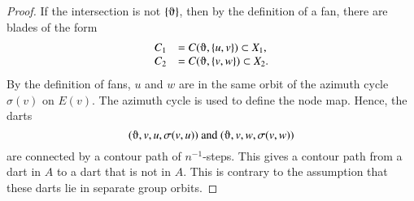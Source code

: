 \begin{proof} 
If the intersection  is not $\{\orgn\}$, then by
the definition
of a fan,
there are blades of the form
  $$
  \begin{array}{lll}
   C_1 &= C(\orgn,\{u,v\})\subset X_1,\\
   C_2 &= C(\orgn,\{v,w\})\subset X_2.\\
  \end{array}
  $$
By the definition of fans, $u$ and $w$ are
in the same orbit of the azimuth cycle $\sigma(v)$ on $E(v)$.
The azimuth cycle is used to define the node map.
Hence, the darts 
   $$
   (\orgn,v,u,\sigma(v,u)) \text{ and }
   (\orgn,v,w,\sigma(v,w))
   $$
are connected by a contour path of $n^{-1}$-steps.
This gives a contour path from a dart in $A$ to a dart that
is not in $A$.
This is contrary to the assumption that these darts lie in
separate group orbits.
\end{proof}




